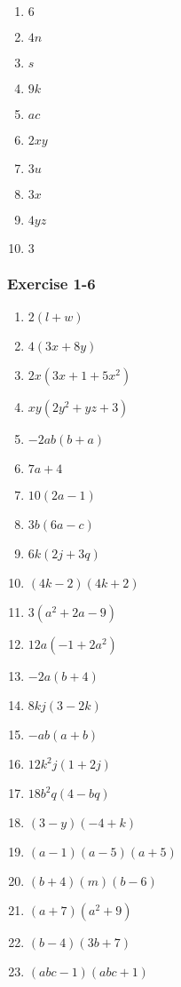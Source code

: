 {\begin{multicols}{3}
\begin{enumerate}[label=\textbf{\arabic*}., noitemsep]
\item $6$%
\item $4n$%
\item $s$%
\item $9k$%
\item $ac$%
\item $2xy$%
\item $3u$%
\item $3x$%
\item $4yz$%
\item $3$%
\end{enumerate}


\subsubsection*{Exercise 1-6} %
\begin{enumerate}[noitemsep, label=\textbf{\arabic*}. ] 
\item $2(l + w)$%
\item $4(3x + 8y)$%
\item $2x(3x + 1 +5x^2)$%
\item $xy(2y^2 + yz + 3)$%
\item $-2ab(b + a)$%
\item $7a + 4$%
\item $10(2a - 1)$%
\item $3b(6a - c)$%
\item $6k(2j + 3q)$%
\item $(4k - 2)(4k + 2)$%
\item $3(a^2 + 2a - 9)$%
\item $12a(-1 + 2a^2)$%
\item $-2a(b + 4)$%
\item $8kj(3 - 2k)$%
\item $-ab(a + b)$%
\item $12k^2j(1 + 2j)$%
\item $18b^2q(4 - bq)$%
\item $(3 - y)(-4 + k)$%
\item $(a - 1)(a - 5)(a + 5)$%
\item $(b + 4)(m)(b - 6)$%
\item $(a + 7)(a^2 + 9)$ %
\item $(b - 4)(3b + 7)$%
\item $(abc - 1)(abc + 1)$%
\end{enumerate}


\end{multicols}}
